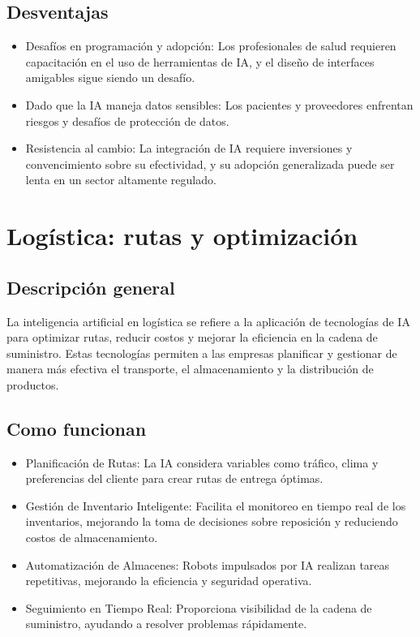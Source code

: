 \documentclass[12pt]{article}
\begin{document}
\subsection{Desventajas}

\begin{itemize}
    \item Desafíos en programación y adopción: 
    Los profesionales de salud requieren capacitación en el uso de herramientas de IA, y el diseño de interfaces amigables 
    sigue siendo un desafío.
    \item Dado que la IA maneja datos sensibles: 
    Los pacientes y proveedores enfrentan riesgos y desafíos de protección de datos.
    \item Resistencia al cambio: 
    La integración de IA requiere inversiones y convencimiento sobre su efectividad, y su adopción generalizada puede ser
    lenta en un sector altamente regulado.
\end{itemize}

\section{Logística: rutas y optimización}

\subsection{Descripción general}

La inteligencia artificial en logística se refiere a la aplicación de tecnologías de IA para optimizar rutas, reducir costos y mejorar
la eficiencia en la cadena de suministro. Estas tecnologías permiten a las empresas planificar y gestionar de manera más efectiva el
transporte, el almacenamiento y la distribución de productos.

\subsection{Como funcionan}

\begin{itemize}
    \item Planificación de Rutas: 
    La IA considera variables como tráfico, clima y preferencias del cliente para crear rutas de entrega óptimas.
    \item Gestión de Inventario Inteligente: 
    Facilita el monitoreo en tiempo real de los inventarios, mejorando la toma de decisiones sobre reposición y reduciendo
    costos de almacenamiento.
    \item Automatización de Almacenes: 
    Robots impulsados por IA realizan tareas repetitivas, mejorando la eficiencia y seguridad operativa.
    \item Seguimiento en Tiempo Real: 
    Proporciona visibilidad de la cadena de suministro, ayudando a resolver problemas rápidamente.
\end{itemize}
\end{document}
